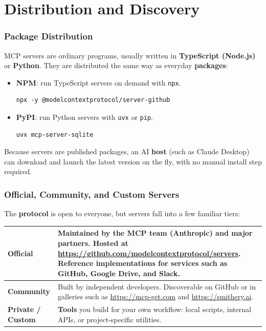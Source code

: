 \newpage
\part{Distribution and Discovery}

\section{Package Distribution}

MCP servers are ordinary programs, usually written in \textbf{TypeScript (Node.js)} or
\textbf{Python}. They are distributed the same way as everyday \textbf{packages}:

\begin{itemize}
  \item \textbf{NPM}: run TypeScript servers on demand with \lstinline[style=inline]|npx|.
\begin{lstlisting}[style=bash]
npx -y @modelcontextprotocol/server-github
\end{lstlisting}
  \item \textbf{PyPI}: run Python servers with \lstinline[style=inline]|uvx| or \lstinline[style=inline]|pip|.
\begin{lstlisting}[style=bash]
uvx mcp-server-sqlite
\end{lstlisting}
\end{itemize}

Because servers are published packages, an AI \textbf{host} (such as Claude Desktop) can
download and launch the latest version on the fly, with no manual install step required.

\section{Official, Community, and Custom Servers}

The \textbf{protocol} is open to everyone, but servers fall into a few familiar tiers:
\begin{paratable}
\begin{tabular}{|l|p{}|}
\hline
\textbf{Official}\vspace{0pt} &
Maintained by the MCP team (Anthropic) and major partners.
Hosted at \url{https://github.com/modelcontextprotocol/servers}.
Reference implementations for services such as GitHub, Google Drive, and Slack.
\\
\hline
\textbf{Community}\vspace{0pt} &
Built by independent developers.
Discoverable on GitHub or in galleries such as
\url{https://mcp-get.com} and \url{https://smithery.ai}.
\\
\hline
\textbf{Private / Custom}\vspace{0pt} &
\textbf{Tools} you build for your own workflow: local scripts, internal APIs, or
project-specific utilities.
\\
\hline
\end{tabular}
\end{paratable}


